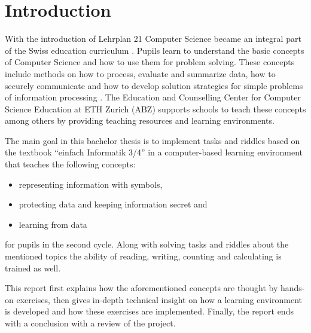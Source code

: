 \chapter{Introduction}

With the introduction of Lehrplan 21 Computer Science became an integral part of the Swiss education curriculum \cite{Lehrplan21}. Pupils learn to understand the basic concepts of Computer Science and how to use them for problem solving. These concepts include methods on how to process, evaluate and summarize data, how to securely communicate and how to develop solution strategies for simple problems of information processing \cite{MedienUndInformatik}. The Education and Counselling Center for Computer Science Education at ETH Zurich (ABZ) supports schools to teach these concepts among others by providing teaching resources and learning environments.

The main goal in this bachelor thesis is to implement tasks and riddles based on the textbook “einfach Informatik 3/4” in a computer-based learning environment that teaches the following concepts:
\begin{itemize}
    \item representing information with symbols,
    \item protecting data and keeping information secret and
    \item learning from data
\end{itemize}
for pupils in the second cycle.
Along with solving tasks and riddles about the mentioned topics the ability of reading, writing, counting and calculating is trained as well.

This report first explains how the aforementioned concepts are thought by hands-on exercises, then gives in-depth technical insight on how a learning environment is developed and how these exercises are implemented. Finally, the report ends with a conclusion with a review of the project.

